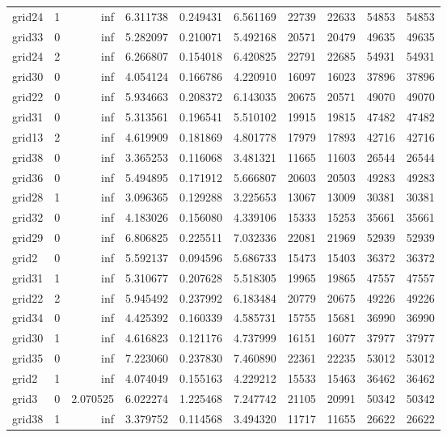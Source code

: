 \begin{longtable}{|l|r|r|r|r|r|r|r|r|r|}
grid24 & 1 & inf & 6.311738 & 0.249431 & 6.561169 & 22739 & 22633 & 54853 & 54853 \\
grid33 & 0 & inf & 5.282097 & 0.210071 & 5.492168 & 20571 & 20479 & 49635 & 49635 \\
grid24 & 2 & inf & 6.266807 & 0.154018 & 6.420825 & 22791 & 22685 & 54931 & 54931 \\
grid30 & 0 & inf & 4.054124 & 0.166786 & 4.220910 & 16097 & 16023 & 37896 & 37896 \\
grid22 & 0 & inf & 5.934663 & 0.208372 & 6.143035 & 20675 & 20571 & 49070 & 49070 \\
grid31 & 0 & inf & 5.313561 & 0.196541 & 5.510102 & 19915 & 19815 & 47482 & 47482 \\
grid13 & 2 & inf & 4.619909 & 0.181869 & 4.801778 & 17979 & 17893 & 42716 & 42716 \\
grid38 & 0 & inf & 3.365253 & 0.116068 & 3.481321 & 11665 & 11603 & 26544 & 26544 \\
grid36 & 0 & inf & 5.494895 & 0.171912 & 5.666807 & 20603 & 20503 & 49283 & 49283 \\
grid28 & 1 & inf & 3.096365 & 0.129288 & 3.225653 & 13067 & 13009 & 30381 & 30381 \\
grid32 & 0 & inf & 4.183026 & 0.156080 & 4.339106 & 15333 & 15253 & 35661 & 35661 \\
grid29 & 0 & inf & 6.806825 & 0.225511 & 7.032336 & 22081 & 21969 & 52939 & 52939 \\
grid2 & 0 & inf & 5.592137 & 0.094596 & 5.686733 & 15473 & 15403 & 36372 & 36372 \\
grid31 & 1 & inf & 5.310677 & 0.207628 & 5.518305 & 19965 & 19865 & 47557 & 47557 \\
grid22 & 2 & inf & 5.945492 & 0.237992 & 6.183484 & 20779 & 20675 & 49226 & 49226 \\
grid34 & 0 & inf & 4.425392 & 0.160339 & 4.585731 & 15755 & 15681 & 36990 & 36990 \\
grid30 & 1 & inf & 4.616823 & 0.121176 & 4.737999 & 16151 & 16077 & 37977 & 37977 \\
grid35 & 0 & inf & 7.223060 & 0.237830 & 7.460890 & 22361 & 22235 & 53012 & 53012 \\
grid2 & 1 & inf & 4.074049 & 0.155163 & 4.229212 & 15533 & 15463 & 36462 & 36462 \\
grid3 & 0 & 2.070525 & 6.022274 & 1.225468 & 7.247742 & 21105 & 20991 & 50342 & 50342 \\
grid38 & 1 & inf & 3.379752 & 0.114568 & 3.494320 & 11717 & 11655 & 26622 & 26622 \\

\end{longtable}
